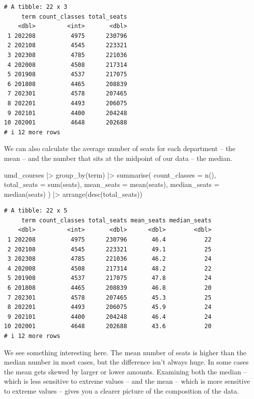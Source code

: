 \documentclass[
  letterpaper,
  DIV=11,
  numbers=noendperiod]{scrreprt}
\newenvironment{Shaded}{\begin{snugshade}}{\end{snugshade}}
\newcommand{\AttributeTok}[1]{\textcolor[rgb]{0.40,0.45,0.13}{#1}}
\newcommand{\FunctionTok}[1]{\textcolor[rgb]{0.28,0.35,0.67}{#1}}
\newcommand{\NormalTok}[1]{\textcolor[rgb]{0.00,0.23,0.31}{#1}}
\newcommand{\SpecialCharTok}[1]{\textcolor[rgb]{0.37,0.37,0.37}{#1}}
\begin{document}
\begin{verbatim}
# A tibble: 22 x 3
     term count_classes total_seats
    <dbl>         <int>       <dbl>
 1 202208          4975      230796
 2 202108          4545      223321
 3 202308          4785      221036
 4 202008          4508      217314
 5 201908          4537      217075
 6 201808          4465      208839
 7 202301          4578      207465
 8 202201          4493      206075
 9 202101          4400      204248
10 202001          4648      202688
# i 12 more rows
\end{verbatim}

We can also calculate the average number of seats for each department --
the mean -- and the number that sits at the midpoint of our data -- the
median.

\begin{Shaded}
\begin{Highlighting}[]
\NormalTok{umd\_courses }\SpecialCharTok{|\textgreater{}}
  \FunctionTok{group\_by}\NormalTok{(term) }\SpecialCharTok{|\textgreater{}}
  \FunctionTok{summarise}\NormalTok{(}
    \AttributeTok{count\_classes =} \FunctionTok{n}\NormalTok{(),}
    \AttributeTok{total\_seats =} \FunctionTok{sum}\NormalTok{(seats),}
    \AttributeTok{mean\_seats =} \FunctionTok{mean}\NormalTok{(seats),}
    \AttributeTok{median\_seats =} \FunctionTok{median}\NormalTok{(seats)}
\NormalTok{  ) }\SpecialCharTok{|\textgreater{}}
  \FunctionTok{arrange}\NormalTok{(}\FunctionTok{desc}\NormalTok{(total\_seats))}
\end{Highlighting}
\end{Shaded}

\begin{verbatim}
# A tibble: 22 x 5
     term count_classes total_seats mean_seats median_seats
    <dbl>         <int>       <dbl>      <dbl>        <dbl>
 1 202208          4975      230796       46.4           22
 2 202108          4545      223321       49.1           25
 3 202308          4785      221036       46.2           24
 4 202008          4508      217314       48.2           22
 5 201908          4537      217075       47.8           24
 6 201808          4465      208839       46.8           20
 7 202301          4578      207465       45.3           25
 8 202201          4493      206075       45.9           24
 9 202101          4400      204248       46.4           24
10 202001          4648      202688       43.6           20
# i 12 more rows
\end{verbatim}

We see something interesting here. The mean number of seats is higher
than the median number in most cases, but the difference isn't always
huge. In some cases the mean gets skewed by larger or lower amounts.
Examining both the median -- which is less sensitive to extreme values
-- and the mean -- which is more sensitive to extreme values -- gives
you a clearer picture of the composition of the data.
\end{document}
